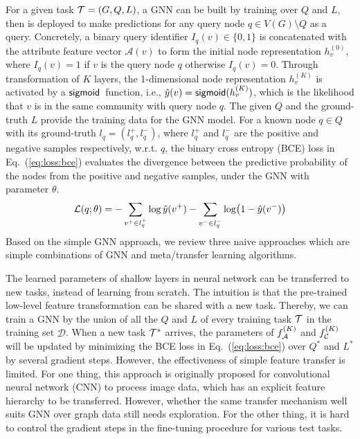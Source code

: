 For a given task $\mathcal{T} = (G, Q, L)$, a GNN can be built by training
over $Q$ and $L$, then is deployed to make predictions for any query
node $q \in V(G) \setminus Q$ as a query.  Concretely, a binary query
identifier $I_q(v) \in \{ 0, 1\}$ is concatenated with the attribute
feature vector $\mathcal{A}(v)$ to form the initial node
representation $h_{v}^{(0)}$, where $I_q(v) = 1$ if $v$ is the query
node $q$ otherwise $I_q(v) = 0$. Through transformation of $K$ layers,
the 1-dimensional node representation $h_v^{(K)}$ is activated by a
$\mathsf{sigmoid}$~function, i.e., $\hat{y}(v) = \mathsf{sigmoid}(h_v^{(K)})$, which
is the likelihood that $v$ is in the same community with query node
$q$.  The given $Q$ and the ground-truth $L$ provide
the training data for the GNN model.  For a known node $q \in Q$ with
its ground-truth $l_q = (l_q^{+}, l_q^{-})$, where $l_q^{+}$ and
$l_q^{-}$ are the positive and negative samples respectively,
w.r.t. $q$, the binary cross entropy (BCE) loss in
Eq.~(\ref{eq:loss:bce}) evaluates the divergence between the
predictive probability of the nodes from the positive and negative
samples, under the GNN with parameter $\theta$.
%
\begin{align}
	\label{eq:loss:bce}
	\mathcal{L}(q; \theta) = - \sum_{v^{+} \in l_q^+} \log\hat{y}(v^+) -  \sum_{v^{-} \in l_q^-} \log (1-\hat{y}(v^-)) 
\end{align}
%
Based on the simple GNN approach, we review three naive approaches
which are simple combinations of GNN and meta/transfer learning
algorithms. 

  The learned parameters of shallow layers in neural network 
can be transferred to new tasks, instead of learning from scratch. The intuition is that the pre-trained low-level feature transformation can be shared with a new task. 
Thereby, we can train a GNN by the union of all the $Q$ and $L$ of every training task $\mathcal{T}$ in the training set $\mathcal{D}$.
When a new task $\mathcal{T}^*$ arrives, the parameters of $f_{\mathcal{A}}^{(K)}$ and $f_{\mathcal{C}}^{(K)}$ will be updated by minimizing the BCE loss in Eq.~(\ref{eq:loss:bce}) over $Q^*$ and $L^*$ by several gradient steps. 
However, the effectiveness of simple feature transfer is limited. For one thing, this approach is originally proposed for convolutional neural network (CNN) to process image data, which has an explicit feature hierarchy to be transferred. However, whether the same transfer mechanism well suits GNN over graph data still needs exploration.  
For the other thing, it is hard to control the gradient steps in the fine-tuning procedure for various test tasks. 


